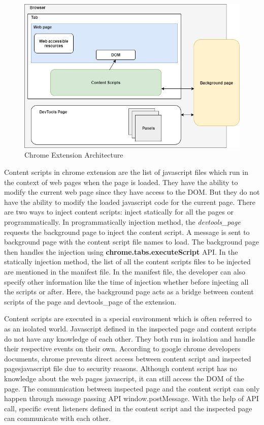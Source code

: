 \begin{figure}[!h]
	\centering
	\includegraphics[scale=0.7,trim=0 0 0 0]{images/chrome-extension-architecture.png}
	\caption{Chrome Extension Architecture}
	\label{fig:extension-architecture}
\end{figure}

Content scripts in chrome extension are the list of javascript files which run in the context of web pages when the page is loaded\cite{contentscripts}. They have the ability to modify the current web page since they have access to the DOM. But they do not have the ability to modify the loaded javascript code for the current page. There are two ways to inject content scripts: inject statically for all the pages or programmatically. In programmatically injection method, the \textit{devtools\_page} requests the background page to inject the content script. A message is sent to background page with the content script file names to load. The background page then handles the injection using \textbf{chrome.tabs.executeScript} API. In the statically injection method, the list of all the content scripts files to be injected are mentioned in the manifest file. In the manifest file, the developer can also specify other information like the time of injection whether before injecting all the scripts or after. Here, the background page acts as a bridge between content scripts of the page and devtools\_page of the extension.

Content scripts are executed in a special environment which is often referred to as an isolated world\cite{contentscripts}. Javascript defined in the inspected page and content scripts do not have any knowledge of each other. They both run in isolation and handle their respective events on their own\cite{contentscripts}. According to google chrome developers documents, chrome prevents direct access between content script and inspected pages\textquotesingle javascript file due to security reasons. Although content script has no knowledge about the web page\textquotesingle s javascript, it can still access the DOM of the page. The communication between inspected page and the content script can only happen through message passing API window.postMessage\cite{contentscripts}. With the help of API call, specific event listeners defined in the content script and the inspected page can communicate with each other.


